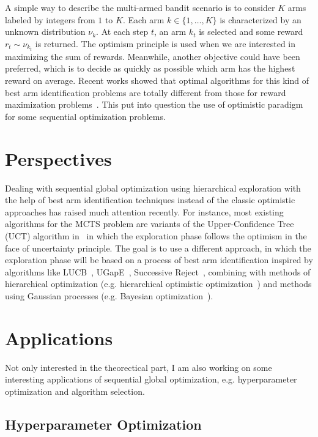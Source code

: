 \documentclass[12pt]{article}
\theoremstyle{plain} \numberwithin{equation}{section}
\theoremstyle{definition}
\begin{document}
A simple way to describe the multi-armed bandit scenario is to consider $K$ arms labeled by integers from $1$ to $K$. Each arm $k\in\{1,\ldots,K\}$ is characterized by an unknown distribution $\nu_k$. At each step $t$, an arm $k_t$ is selected and some reward $r_t\sim\nu_{k_t}$ is returned. The optimism principle is used when we are interested in maximizing the sum of rewards. Meanwhile, another objective could have been preferred, which is to decide as quickly as possible which arm has the highest reward on average. Recent works showed that optimal algorithms for this kind of best arm identification problems are totally different from those for reward maximization problems~\cite{bubeck2011b,kaufmann2017}. This put into question the use of optimistic paradigm for some sequential optimization problems.

\section{Perspectives}

Dealing with sequential global optimization using hierarchical exploration with the help of best arm identification techniques instead of the classic optimistic approaches has raised much attention recently. For instance, most existing algorithms for the MCTS problem are variants of the Upper-Confidence Tree (UCT) algorithm in~\cite{kocsis2006} in which the exploration phase follows the optimism in the face of uncertainty principle. The goal is to use a different approach, in which the exploration phase will be based on a process of best arm identification inspired by algorithms like LUCB~\cite{kaly2012}, UGapE~\cite{gabillon2012}, Successive Reject~\cite{audibert2010}, combining with  methods of hierarchical optimization (e.g. hierarchical optimistic optimization~\cite{grill2015,bubeck2011a}) and methods using Gaussian processes (e.g. Bayesian optimization~\cite{brochu2010}). 

\section{Applications}

Not only interested in the theorectical part, I am also working on some interesting applications of sequential global optimization, e.g. hyperparameter optimization and algorithm selection.

\subsection{Hyperparameter Optimization}
\end{document}
